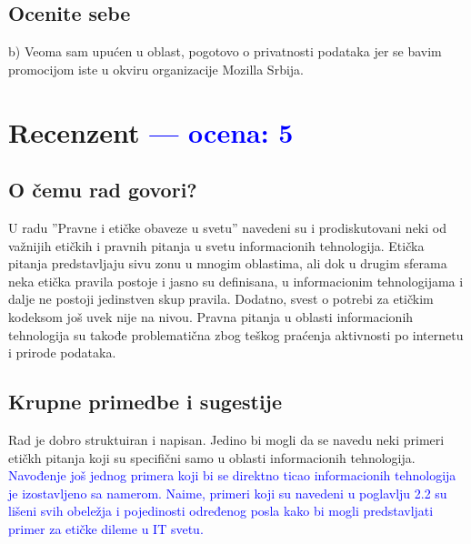 \documentclass[a4paper]{report}
\newcommand{\odgovor}[1]{\textcolor{blue}{#1}}
\begin{document}
\section{Ocenite sebe}
b) Veoma sam upućen u oblast, pogotovo o privatnosti podataka jer se bavim promocijom iste u okviru organizacije Mozilla Srbija.

\chapter{Recenzent \odgovor{--- ocena: 5} }


\section{O čemu rad govori?}

U radu ''Pravne i etičke obaveze u svetu'' navedeni su i prodiskutovani neki od važnijih etičkih i pravnih pitanja u svetu informacionih tehnologija. Etička pitanja predstavljaju sivu zonu u mnogim oblastima, ali dok u drugim sferama neka etička pravila postoje i jasno su definisana, u informacionim tehnologijama i dalje ne postoji jedinstven skup pravila. Dodatno, svest o potrebi za etičkim kodeksom još uvek nije na nivou. Pravna pitanja u oblasti informacionih tehnologija su takođe problematična zbog teškog praćenja aktivnosti po internetu i prirode podataka.

\section{Krupne primedbe i sugestije}
Rad je dobro struktuiran i napisan. Jedino bi mogli da se navedu neki primeri etičkh pitanja koji su specifični samo u oblasti informacionih tehnologija. \\

\odgovor{Navođenje još jednog primera koji bi se direktno ticao informacionih tehnologija je izostavljeno sa namerom. Naime, primeri koji su navedeni u poglavlju 2.2 su lišeni svih obeležja i pojedinosti određenog posla kako bi mogli predstavljati primer za etičke dileme u IT svetu.}
\end{document}
